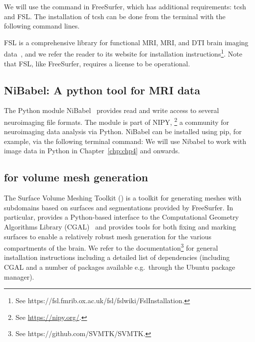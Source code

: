 We will use the command  in FreeSurfer, which has
additional requirements: tcsh and FSL. The installation of tcsh can be
done from the terminal with the following command lines.

FSL is a comprehensive library for functional MRI, MRI, and DTI brain imaging
data~\cite{jenkinson2012fsl}, and we refer the reader to its website for
installation
instructions\footnote{See https://fsl.fmrib.ox.ac.uk/fsl/fslwiki/FslInstallation.}. Note
that FSL, like FreeSurfer, requires a license to be operational.

\subsection{NiBabel: A python tool for MRI data}
\label{sec:chp2:tools:nibabel-numpy}

The Python module NiBabel~\cite{brett_matthew_2020_4295521} provides read and write
access to several neuroimaging file formats. The module is part of
NIPY, \footnote{See \url{https://nipy.org/}.} a community for neuroimaging
data analysis via Python. NiBabel can be installed using pip, for example, via the  
following terminal command:
\noindent We will use Nibabel to work with image data in Python in 
Chapter~\ref{chp:chp4} and onwards.

\subsection{\svmtk{} for volume mesh generation}
\label{sec:chp2:tools:meshing:svmtk}

The Surface Volume Meshing Toolkit (\svmtk{}) is a toolkit for
generating meshes with subdomains based on surfaces and segmentations
provided by FreeSurfer. In particular, \svmtk{} provides a
Python-based interface to the Computational Geometry Algorithms
Library (CGAL)~\cite{fabri2000design} and provides tools for both
fixing and marking surfaces to enable a relatively robust mesh
generation for the various compartments of the brain.  We refer to the
\svmtk{} documentation\footnote{See https://github.com/SVMTK/SVMTK.} for
general installation instructions including a detailed list of
dependencies (including CGAL and a number of packages available
e.g.~through the Ubuntu package manager).

